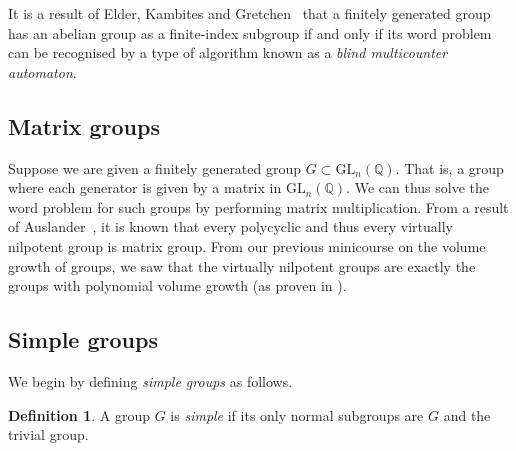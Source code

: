 \documentclass[11pt,a4paper,reqno]{amsart}
\theoremstyle{plain}
\theoremstyle{definition}
\newtheorem{definition}[theorem]{Definition}
\theoremstyle{definition}
\begin{document}
It is a result of Elder, Kambites and Gretchen~\cite{elder2008} that a finitely generated group has an abelian group as a finite-index subgroup if and only if its word problem can be recognised by a type of algorithm known as a \textit{blind multicounter automaton}.

\subsection{Matrix groups}

Suppose we are given a finitely generated group $G \subset \mathrm{GL}_n(\mathbb Q)$.
That is, a group where each generator is given by a matrix in $\mathrm{GL}_n(\mathbb Q)$.
We can thus solve the word problem for such groups by performing matrix multiplication.
From a result of Auslander~\cite[Theorem~2]{Auslander1967}, it is known that every polycyclic and thus every virtually nilpotent group is matrix group.
From our previous minicourse \cite{minicoursePrev} on the volume growth of groups, we saw that the virtually nilpotent groups are exactly the groups with polynomial volume growth (as proven in \cite{Gromov1981}).

\subsection{Simple groups}\label{sec:solvable-simple}

We begin by defining \emph{simple groups} as follows.

\begin{definition}
A group $G$ is \emph{simple} if its only normal subgroups are $G$ and the trivial group.
\end{definition}
\end{document}
